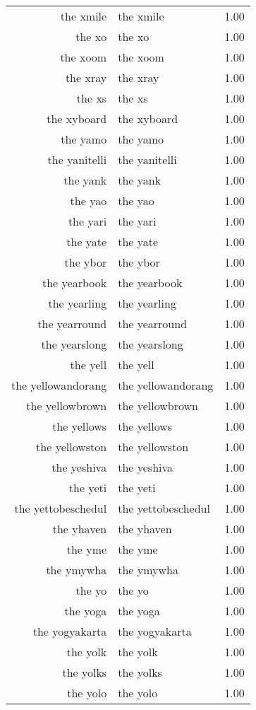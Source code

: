 \begin{table}[ht]
\begin{tabular}{rlr}
  the xmile & the xmile & 1.00 \\ 
  the xo & the xo & 1.00 \\ 
  the xoom & the xoom & 1.00 \\ 
  the xray & the xray & 1.00 \\ 
  the xs & the xs & 1.00 \\ 
  the xyboard & the xyboard & 1.00 \\ 
  the yamo & the yamo & 1.00 \\ 
  the yanitelli & the yanitelli & 1.00 \\ 
  the yank & the yank & 1.00 \\ 
  the yao & the yao & 1.00 \\ 
  the yari & the yari & 1.00 \\ 
  the yate & the yate & 1.00 \\ 
  the ybor & the ybor & 1.00 \\ 
  the yearbook & the yearbook & 1.00 \\ 
  the yearling & the yearling & 1.00 \\ 
  the yearround & the yearround & 1.00 \\ 
  the yearslong & the yearslong & 1.00 \\ 
  the yell & the yell & 1.00 \\ 
  the yellowandorang & the yellowandorang & 1.00 \\ 
  the yellowbrown & the yellowbrown & 1.00 \\ 
  the yellows & the yellows & 1.00 \\ 
  the yellowston & the yellowston & 1.00 \\ 
  the yeshiva & the yeshiva & 1.00 \\ 
  the yeti & the yeti & 1.00 \\ 
  the yettobeschedul & the yettobeschedul & 1.00 \\ 
  the yhaven & the yhaven & 1.00 \\ 
  the yme & the yme & 1.00 \\ 
  the ymywha & the ymywha & 1.00 \\ 
  the yo & the yo & 1.00 \\ 
  the yoga & the yoga & 1.00 \\ 
  the yogyakarta & the yogyakarta & 1.00 \\ 
  the yolk & the yolk & 1.00 \\ 
  the yolks & the yolks & 1.00 \\ 
  the yolo & the yolo & 1.00 \\ 

\end{tabular}
\end{table}
